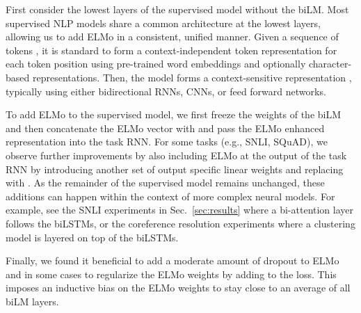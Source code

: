 \documentclass[11pt,a4paper]{article}
\newcommand{\ELMO}{ELMo}
\begin{document}
First consider the lowest layers of the supervised model without the biLM.
Most supervised NLP models share a common architecture at the lowest layers, allowing us to add \ELMO{} in a consistent, unified manner.
Given a sequence of tokens , it is standard to form a context-independent token representation  for each token position using pre-trained word embeddings and optionally character-based representations.
Then, the model forms a context-sensitive representation
, typically using either bidirectional RNNs, CNNs, or feed forward networks.





To add \ELMO{} to the supervised model, we first freeze the weights of the biLM and then concatenate the \ELMO{} vector  with  and pass the \ELMO{} enhanced representation  into the task RNN.
For some tasks (e.g., SNLI, SQuAD), we observe further improvements by also including \ELMO{} at the output of the task RNN by introducing another set of output specific linear weights and replacing  with .
As the remainder of the supervised model remains unchanged, these additions can happen within the context of more complex neural models.
For example, see the SNLI experiments in Sec.~\ref{sec:results} where a bi-attention layer follows the biLSTMs, or the coreference resolution experiments where a clustering model is layered on top of the biLSTMs. 

Finally, we found it beneficial to add a moderate amount of dropout to \ELMO{} \citep{Srivastava2014DropoutAS} and in some cases to regularize the \ELMO{} weights by
adding
 to the loss.
This imposes an inductive bias on the \ELMO{} weights to stay close to an average of all biLM layers.
\end{document}
